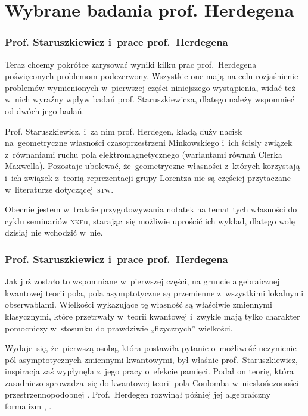 \documentclass[10pt,t]{beamer}
\begin{document}
\section{Wybrane badania prof. Herdegena}


\begin{frame}
  \frametitle{Prof. Staruszkiewicz i~prace prof.~Herdegena}


  Teraz chcemy pokrótce zarysować wyniki kilku prac prof.~Herdegena
  poświęconych problemom podczerwony. Wszystkie one mają na celu
  rozjaśnienie problemów wymienionych w~pierwszej części niniejszego
  wystąpienia, widać też w~nich wyraźny wpływ badań prof. Staruszkiewicza,
  dlatego należy wspomnieć od dwóch jego badań.

  Prof. Staruszkiewicz, i~za nim prof. Herdegen, kładą duży nacisk
  na~geometryczne własności czasoprzestrzeni Minkowskiego i~ich ścisły
  związek z~równaniami ruchu pola elektromagnetycznego (wariantami równań
  Clerka Maxwella). Pozostaje ubolewać, że~geometryczne własności z~których
  korzystają i~ich związek z~teorią reprezentacji grupy Lorentza nie są
  częściej przytaczane w~literaturze dotyczącej~\textsc{stw}.

  Obecnie jestem w~trakcie przygotowywania notatek na temat tych własności
  do cyklu seminariów \textsc{nkf}u, starając~się możliwie uprościć ich
  wykład, dlatego wolę dzisiaj nie wchodzić w~nie.

\end{frame}





\begin{frame}
  \frametitle{Prof. Staruszkiewicz i~prace prof.~Herdegena}


  Jak już zostało to wspomniane w~pierwszej części, na gruncie algebraicznej
  kwantowej teorii pola, pola asymptotyczne są przemienne z~wszystkimi
  lokalnymi obserwablami. Wielkości wykazujące tę własność są
  właściwie zmiennymi klasycznymi, które przetrwały w~teorii kwantowej
  i~zwykle mają tylko charakter pomocniczy w~stosunku do prawdziwie
  „fizycznych” wielkości.

  Wydaje~się, że~pierwszą osobą, która postawiła pytanie o~możliwość
  uczynienie pól asymptotycznych zmiennymi kwantowymi, był właśnie
  prof.~Staruszkiewicz, inspiracja zaś wypłynęła z~jego pracy o~efekcie
  pamięci. Podał on teorię, która zasadniczo sprowadza~się do kwantowej
  teorii pola Coulomba w~nieskończoności przestrzennopodobnej
  \parencite{Staruszkiewicz-Quantum-Mechanics-of-Phase-and-Charge-ETC-Pub-1989}.
  Prof.~Herdegen rozwinął później jej algebraiczny formalizm
  \parencite{Herdegen-Asymptotic-algebra-of-quantum-electrodynamics-Pub-2005},
  \parencite{Herdegen-Remarks-on-mathematical-structure-of-ETC-Pub-2022} .

\end{frame}
\end{document}
